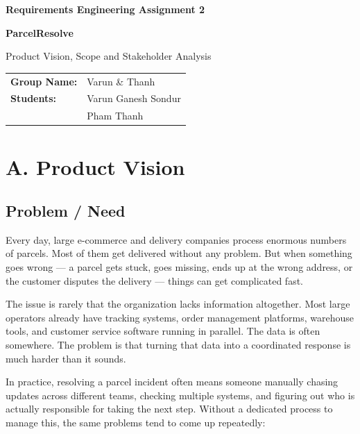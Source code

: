 \documentclass[11pt,a4paper]{article}
\begin{document}

\begin{center}
    {\Large\bfseries Requirements Engineering Assignment 2}

    \vspace{0.2cm}

    {\large\bfseries ParcelResolve}

    \vspace{0.15cm}

    Product Vision, Scope and Stakeholder Analysis
\end{center}

\vspace{0.35cm}

\begin{tabular}{@{}ll@{}}
\textbf{Group Name:} & Varun \& Thanh \\
\textbf{Students:}   & Varun Ganesh Sondur \\
                     & Pham Thanh
\end{tabular}


\section{A. Product Vision}

\subsection{Problem / Need}

Every day, large e-commerce and delivery companies process enormous
numbers of parcels. Most of them get delivered without any problem.
But when something goes wrong --- a parcel gets stuck, goes missing,
ends up at the wrong address, or the customer disputes the delivery ---
things can get complicated fast.

The issue is rarely that the organization lacks information altogether.
Most large operators already have tracking systems, order management
platforms, warehouse tools, and customer service software running in
parallel. The data is often somewhere. The problem is that turning that
data into a coordinated response is much harder than it sounds.

In practice, resolving a parcel incident often means someone manually
chasing updates across different teams, checking multiple systems, and
figuring out who is actually responsible for taking the next step.
Without a dedicated process to manage this, the same problems tend to
come up repeatedly:
\end{document}
